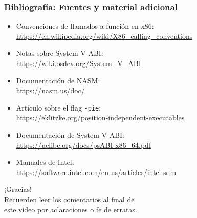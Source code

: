 \documentclass[aspectratio=169]{beamer}
\begin{document}
\begin{frame}[fragile]
    \frametitle{Bibliografía: Fuentes y material adicional}
    \begin{itemize}
    \item Convenciones de llamados a función en x86: \\
    \url{https://en.wikipedia.org/wiki/X86_calling_conventions}
    \item Notas sobre System V ABI: \\
    \url{https://wiki.osdev.org/System_V_ABI}
    \item Documentación de NASM: \\
    \url{https://nasm.us/doc/}
    \item Artículo sobre el flag \texttt{-pie}: \\
    \url{https://eklitzke.org/position-independent-executables}
    \item Documentación de System V ABI: \\
    \url{https://uclibc.org/docs/psABI-x86_64.pdf}
    \item Manuales de Intel: \\
    \url{https://software.intel.com/en-us/articles/intel-sdm}
    \end{itemize}
\end{frame}

\begin{frame}[plain]
\begin{center}
\vspace{2cm}
\huge ¡Gracias!\\
\vspace{2cm}
\normalsize Recuerden leer los comentarios al final de \\ este video por aclaraciones o fe de erratas.
\end{center}
\end{frame}
\end{document}
